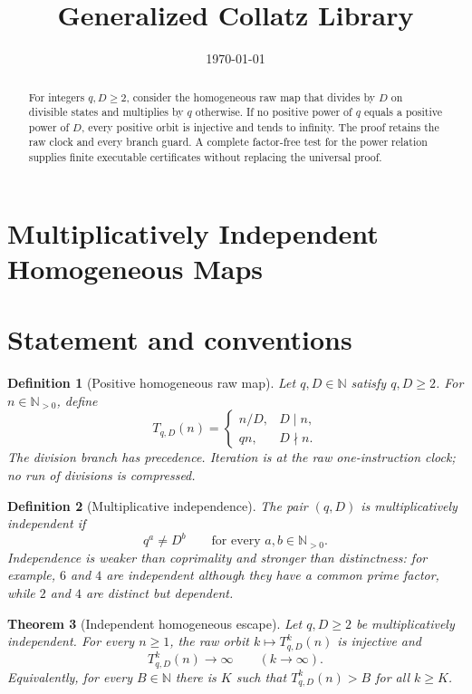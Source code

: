 \documentclass[11pt,letterpaper]{article}
\title{Generalized Collatz Library}
\author{}
\date{\today}
\newtheorem{theorem}{Theorem}
\newtheorem{definition}[theorem]{Definition}
\newcommand{\N}{\mathbb{N}}
\begin{document}
\maketitle
\section*{Multiplicatively Independent Homogeneous Maps}

\begin{abstract}
For integers $q,D\geq 2$, consider the homogeneous raw map that divides by
$D$ on divisible states and multiplies by $q$ otherwise.  If no positive
power of $q$ equals a positive power of $D$, every positive orbit is
injective and tends to infinity.  The proof retains the raw clock and every
branch guard.  A complete factor-free test for the power relation supplies
finite executable certificates without replacing the universal proof.
\end{abstract}

\section{Statement and conventions}

\begin{definition}[Positive homogeneous raw map]
Let $q,D\in\N$ satisfy $q,D\geq 2$.  For $n\in\N_{>0}$, define
\[
 T_{q,D}(n)=
 \begin{cases}
  n/D,&D\mid n,\\
  qn,&D\nmid n.
 \end{cases}
\]
The division branch has precedence.  Iteration is at the raw one-instruction
clock; no run of divisions is compressed.
\end{definition}

\begin{definition}[Multiplicative independence]
The pair $(q,D)$ is multiplicatively independent if
\[
 q^a\neq D^b
 \qquad\text{for every }a,b\in\N_{>0}.
\]
Independence is weaker than coprimality and stronger than distinctness: for
example, $6$ and $4$ are independent although they have a common prime factor,
while $2$ and $4$ are distinct but dependent.
\end{definition}

\begin{theorem}[Independent homogeneous escape]\label{thm:escape}
Let $q,D\geq 2$ be multiplicatively independent.  For every $n\geq 1$,
the raw orbit $k\mapsto T_{q,D}^{k}(n)$ is injective and
\[
 T_{q,D}^{k}(n)\longrightarrow\infty
 \qquad (k\longrightarrow\infty).
\]
Equivalently, for every $B\in\N$ there is $K$ such that
$T_{q,D}^{k}(n)>B$ for all $k\geq K$.
\end{theorem}
\end{document}
